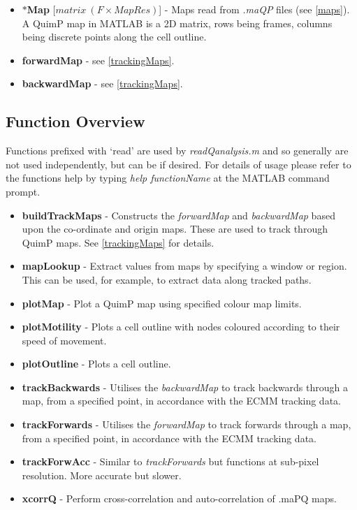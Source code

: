 \documentclass[a4paper,12pt]{article}
\begin{document}
\begin{itemize}
   \item \textbf{$\ast$Map} [$matrix~(F\times MapRes)$] - Maps read from \textit{.maQP} files (see \autoref{maps}).  A QuimP map 
   in MATLAB is a 2D matrix, rows being frames, columns being discrete points along the cell outline.

  \item \textbf{forwardMap} - see \autoref{trackingMaps}.
  
  \item \textbf{backwardMap} - see \autoref{trackingMaps}.
     
\end{itemize}


\subsection{Function Overview}

Functions prefixed with `read'  are used by \textit{readQanalysis.m} and so generally are not used
independently, but can be if desired.    For details of usage please refer to the
functions help by typing \textit{help functionName} at the MATLAB command prompt.

\begin{itemize}

 \item \textbf{buildTrackMaps} - Constructs the \textit{forwardMap} and \textit{backwardMap} based 
 upon the co-ordinate and origin maps.  These are used to track through QuimP maps.  See \autoref{trackingMaps} for details.
 
 \item \textbf{mapLookup} - Extract values from maps by specifying a window or region.  This can be used, for example, to extract data
 along tracked paths.
 
 \item \textbf{plotMap} - Plot a QuimP map using specified colour map limits.
 
 \item \textbf{plotMotility} - Plots a cell outline with nodes coloured according to their speed of movement.
 
 \item \textbf{plotOutline} - Plots a cell outline.
 
 \item \textbf{trackBackwards} - Utilises the \textit{backwardMap} to track backwards through a map, from a specified point,
 in accordance with the ECMM tracking data. 
 
 \item \textbf{trackForwards} - Utilises the \textit{forwardMap} to track forwards through a map, from a specified point,
 in accordance with the ECMM tracking data.
 
  \item \textbf{trackForwAcc} - Similar to \textit{trackForwards} but functions at sub-pixel resolution. More accurate but slower.
   
 \item \textbf{xcorrQ} - Perform cross-correlation and auto-correlation of .maPQ maps.
 
 \end{itemize}
\end{document}
